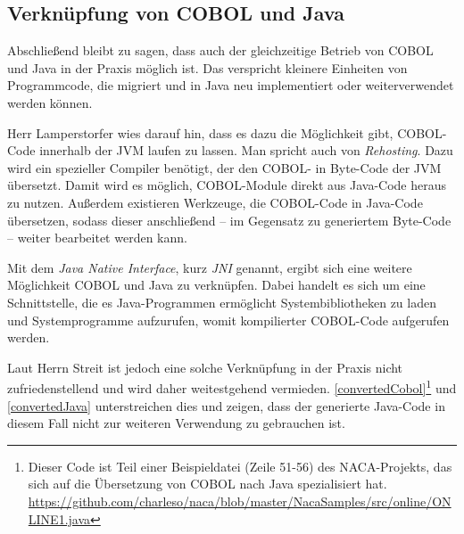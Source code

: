 \subsection*{Verknüpfung von COBOL und Java} \label{cobolandjava}

Abschließend bleibt zu sagen, dass auch der gleichzeitige Betrieb von COBOL und Java in der Praxis möglich ist. Das verspricht kleinere Einheiten von Programmcode, die migriert und in Java neu implementiert oder weiterverwendet werden können.

Herr Lamperstorfer wies darauf hin, dass es dazu die Möglichkeit gibt, COBOL-Code innerhalb der JVM laufen zu lassen. Man spricht auch von \textit{Rehosting}. Dazu wird ein spezieller Compiler benötigt, der den COBOL- in Byte-Code der JVM übersetzt. Damit wird es möglich, COBOL-Module direkt aus Java-Code heraus zu nutzen. Außerdem existieren Werkzeuge, die COBOL-Code in Java-Code übersetzen, sodass dieser anschließend -- im Gegensatz zu generiertem Byte-Code -- weiter bearbeitet werden kann. 

Mit dem \textit{Java Native Interface}, kurz \textit{JNI} genannt, ergibt sich eine weitere Möglichkeit COBOL und Java zu verknüpfen. Dabei handelt es sich um eine Schnittstelle, die es Java-Programmen ermöglicht Systembibliotheken zu laden und Systemprogramme aufzurufen, womit kompilierter COBOL-Code aufgerufen werden.


Laut Herrn Streit ist jedoch eine solche Verknüpfung in der Praxis nicht zufriedenstellend und wird daher weitestgehend vermieden. \autoref{convertedCobol}\footnote{\label{convertedFootnote} Dieser Code ist Teil einer Beispieldatei (Zeile 51-56) des NACA-Projekts, das sich auf die Übersetzung von COBOL nach Java spezialisiert hat.\\\url{https://github.com/charleso/naca/blob/master/NacaSamples/src/online/ONLINE1.java} \visitedOn} und \autoref{convertedJava} unterstreichen dies und zeigen, dass der generierte Java-Code in diesem Fall nicht zur weiteren Verwendung zu gebrauchen ist.